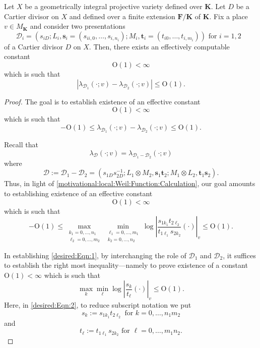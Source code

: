 \documentclass[10pt,a4paper]{amsart}
\newcommand{\FF}{\mathbf{F}}
\newcommand{\KK}{\mathbf{K}}
\renewcommand{\leq}{\leqslant}
\begin{document}
\begin{theorem}\label{explicit:local:weil:constant}
Let $X$ be a geometrically integral projective variety defined over $\KK$.
Let $D$ be a Cartier divisor on $X$ and defined over a finite extension $\FF / \KK$ of $\KK$.
  Fix a place $v \in M_{\KK}$ and consider two presentations
  $$
\mathcal{D}_i = (s_{iD}; L_i,\mathbf{s}_i = (s_{ii,0},\dots,s_{i,n_i}); M_i, \mathbf{t}_i = (t_{i0},\dots,t_{i,m_i})) \text{ for $i = 1,2$ }
$$
of a Cartier divisor $D$ on $X$.  Then, there exists an effectively computable constant 
$$\mathrm{O}(1) < \infty$$ 
which is such that
$$
|\lambda_{\mathcal{D}_1}(\cdot;v) - \lambda_{\mathcal{D}_2}(\cdot;v)| \leq \mathrm{O}(1) \text{.}
$$
\end{theorem}

\begin{proof}

The goal is to establish existence of an effective constant 
$$
\mathrm{O}(1) < \infty 
$$
which is such that 
$$
- \mathrm{O}(1) \leq \lambda_{\mathcal{D}_1}(\cdot;v) - \lambda_{\mathcal{D}_2}(\cdot;v) \leq \mathrm{O}(1) \text{.}
$$

Recall that
$$
\lambda_{\mathcal{D}}(\cdot;v) = \lambda_{\mathcal{D}_1 - \mathcal{D}_2}(\cdot;v) 
$$
where
$$
\mathcal{D} := \mathcal{D}_1 - \mathcal{D}_2 = (s_{1D}s_{2D}^{-1}; L_1 \otimes M_2, \mathbf{s}_1 \mathbf{t}_2; M_1 \otimes L_2, \mathbf{t}_1 \mathbf{s}_2) \text{.}
$$
Thus, in light of \eqref{motivational:local:Weil:Function:Calculation}, 
our goal amounts to establishing existence of an effective constant 
$$\mathrm{O}(1) < \infty$$ 
which is such that
\begin{equation}\label{desired:Eqn:1}
- \mathrm{O}(1) \leq \max_{\substack{k_1 = 0,\dots,n_1 \\
\ell_2 = 0,\dots,m_2}} \min_{\substack{\ell_1 = 0,\dots,m_1 \\ k_2 = 0,\dots,n_2}} \log \left| \frac{s_{1 {k_1}} t_{2 {\ell_2}}  }{  t_{1 {\ell_1}} s_{2 {k_2}}  }(\cdot) \right|_v \leq \mathrm{O}(1) \text{.}
\end{equation}

In establishing \eqref{desired:Eqn:1}, by interchanging the role of $\mathcal{D}_1$ and $\mathcal{D}_2$, it suffices to establish the right most inequality---namely to prove existence of a constant $\mathrm{O}(1) < \infty$ which is such that 
\begin{equation}\label{desired:Eqn:2}
\max_k \min_{\ell} \log \left| \frac{s_k}{t_\ell}(\cdot) \right|_v \leq \mathrm{O}(1) \text{.}
\end{equation} 
Here, in \eqref{desired:Eqn:2}, to reduce subscript notation we put 
$$s_k := s_{1 {k_1}} t_{2 {\ell_2}} \text{ for $k = 0,\dots, n_1m_2$}$$ 
and 
$$t_\ell := t_{1 {\ell_1}} s_{2 {k_2}} \text{ for $\ell = 0,\dots, m_1 n_2$.}$$


\end{proof}
\end{document}
